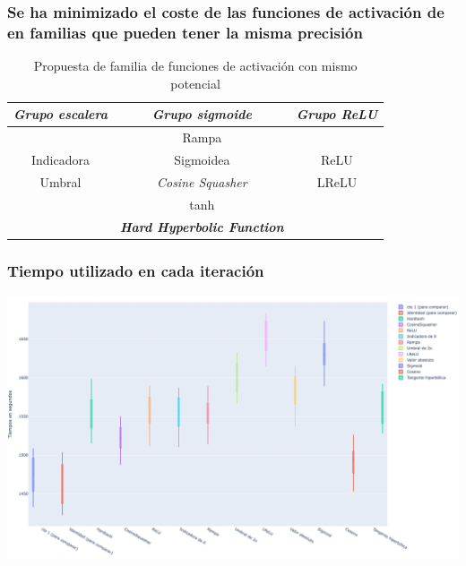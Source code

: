 \documentclass{beamer}
\begin{document}
\begin{frame}
    \frametitle{Se ha minimizado el coste de las funciones de activación de en familias que pueden tener la misma precisión}
    
    \begin{table}[H] 
        \centering  
        \begin{tabular}{| c | c | c | }
            \hline
            \textit{Grupo escalera} & \textit{Grupo sigmoide} & \textit{Grupo ReLU} \\
            \hline
           &  Rampa &  \\
           Indicadora & Sigmoidea & ReLU\\
           Umbral & \textit{Cosine Squasher}& LReLU\\
            & tanh & \\
            & \textbf{\textit{Hard Hyperbolic Function}}& \\
    \hline
        \end{tabular}
        \caption{Propuesta de familia de funciones de activación con mismo potencial}  
        \label{table:Clases-equivalencia-activation-function}
    \end{table}

\end{frame}
\begin{frame}
    \frametitle{Tiempo utilizado en cada iteración}

    \includegraphics[width=\textwidth]{5-estudio-experimental/activation-function/boxplot-whiskers-activation-function.png}

\end{frame}
\end{document}
